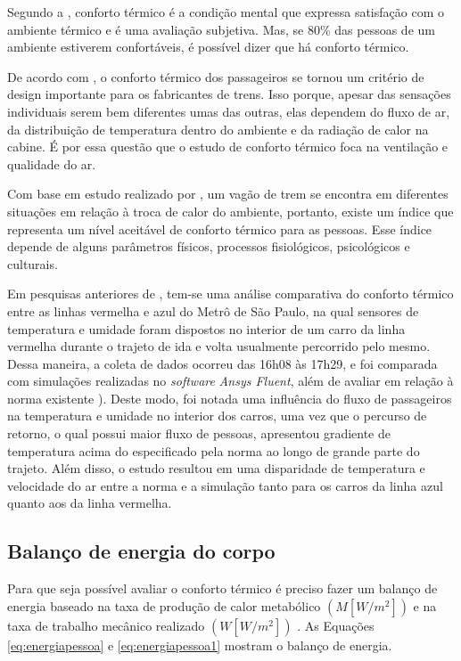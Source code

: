 \documentclass[acronym,symbols,table]{fei}
\begin{document}
Segundo a \textcite{ASHRAE2009}, conforto térmico é a condição mental que expressa satisfação com o ambiente térmico e é uma avaliação subjetiva. Mas, se 80\% das pessoas de um ambiente estiverem confortáveis, é possível dizer que há conforto térmico.

De acordo com \textcite{konstantinov2015numerical}, o conforto térmico dos passageiros se tornou um critério de design importante para os fabricantes de trens. Isso porque, apesar das sensações individuais serem bem diferentes umas das outras, elas dependem do fluxo de ar, da distribuição de temperatura dentro do ambiente e da radiação de calor na cabine. É por essa questão que o estudo de conforto térmico foca na ventilação e qualidade do ar.

Com base em estudo realizado por \textcite{casellisimulaccao}, um vagão de trem se encontra em diferentes situações em relação à troca de calor do ambiente, portanto, existe um índice que representa um nível aceitável de conforto térmico para as pessoas. Esse índice depende de alguns parâmetros físicos, processos fisiológicos, psicológicos e culturais. 

Em pesquisas anteriores de \textcite{TCCThomas}, tem-se uma análise comparativa do conforto térmico entre as linhas vermelha e azul do Metrô de São Paulo, na qual sensores de temperatura e umidade foram dispostos no interior de um carro da linha vermelha durante o trajeto de ida e volta usualmente percorrido pelo mesmo. Dessa maneira, a coleta de dados ocorreu das 16h08 às 17h29, e foi comparada com simulações realizadas no \textit{software} \textit{Ansys Fluent}, além de avaliar em relação à norma existente \cite{handbook2006american}). Deste modo, foi notada uma influência do fluxo de passageiros na temperatura e umidade no interior dos carros, uma vez que o percurso de retorno, o qual possui maior fluxo de pessoas, apresentou gradiente de temperatura acima do especificado pela norma ao longo de grande parte do trajeto. Além disso, o estudo resultou em uma disparidade de temperatura e velocidade do ar entre a norma e a simulação tanto para os carros da linha azul quanto aos da linha vermelha.

\subsection{Balanço de energia do corpo}

Para que seja possível avaliar o conforto térmico é preciso fazer um balanço de energia baseado na taxa de produção de calor metabólico $(M [W/m^{2}])$ e na taxa de trabalho mecânico realizado $(W [W/m^{2}])$ \cite{ASHRAE2009}. As Equações \ref{eq:energiapessoa} e \ref{eq:energiapessoa1} mostram o balanço de energia.
\end{document}
